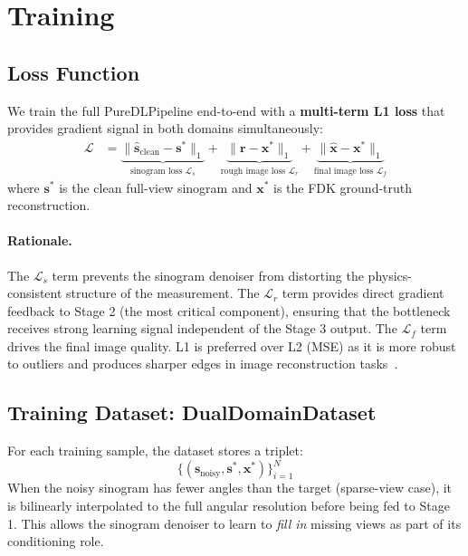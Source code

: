 \documentclass[10pt,twocolumn]{article}
\newcommand{\myvec}[1]{\bm{#1}}
\begin{document}
\section{Training}
\label{sec:training}

\subsection{Loss Function}

We train the full PureDLPipeline end-to-end with a
\textbf{multi-term L1 loss} that provides gradient signal in both
domains simultaneously:
\begin{align}
    \mathcal{L} &=
        \underbrace{\|\hat{\myvec{s}}_{\text{clean}} - \myvec{s}^{*}\|_1}_{\text{sinogram loss } \mathcal{L}_s}
        + \underbrace{\|\myvec{r} - \myvec{x}^{*}\|_1}_{\text{rough image loss } \mathcal{L}_r}
        + \underbrace{\|\hat{\myvec{x}} - \myvec{x}^{*}\|_1}_{\text{final image loss } \mathcal{L}_f}
    \label{eq:loss}
\end{align}
where $\myvec{s}^{*}$ is the clean full-view sinogram and
$\myvec{x}^{*}$ is the FDK ground-truth reconstruction.

\paragraph{Rationale.}
The $\mathcal{L}_s$ term prevents the sinogram denoiser from
distorting the physics-consistent structure of the measurement.
The $\mathcal{L}_r$ term provides direct gradient feedback to
Stage 2 (the most critical component), ensuring that the bottleneck
receives strong learning signal independent of the Stage 3 output.
The $\mathcal{L}_f$ term drives the final image quality.
L1 is preferred over L2 (MSE) as it is more robust to outliers and
produces sharper edges in image reconstruction tasks~\cite{zhao2017}.

\subsection{Training Dataset: DualDomainDataset}

For each training sample, the dataset stores a triplet:
\begin{equation}
    \{(\myvec{s}_{\text{noisy}}, \myvec{s}^{*}, \myvec{x}^{*})\}_{i=1}^{N}
    \label{eq:triplet}
\end{equation}
When the noisy sinogram has fewer angles than the target
(sparse-view case), it is bilinearly interpolated to the full
angular resolution before being fed to Stage 1.
This allows the sinogram denoiser to learn to \textit{fill in}
missing views as part of its conditioning role.
\end{document}
